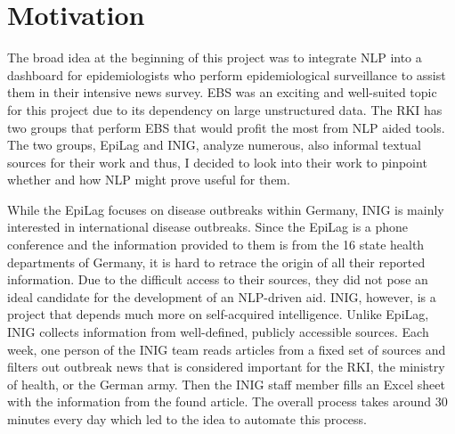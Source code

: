 
\section{Motivation}
  The broad idea at the beginning of this project was to integrate NLP into a dashboard for epidemiologists who perform epidemiological surveillance to assist them in their intensive news survey.
  EBS was an exciting and well-suited topic for this project due to its dependency on large unstructured data.
  The RKI has two groups that perform EBS that would profit the most from NLP aided tools. The two groups, EpiLag and INIG, analyze numerous, also informal textual sources for their work and thus, I decided to look into their work to pinpoint whether and how NLP might prove useful for them.

  While the EpiLag focuses on disease outbreaks within Germany, INIG is mainly interested in international disease outbreaks. Since the EpiLag is a phone conference and the information provided to them is from the 16 state health departments of Germany, it is hard to retrace the origin of all their reported information.
  Due to the difficult access to their sources, they did not pose an ideal candidate for the development of an NLP-driven aid.
  INIG, however, is a project that depends much more on self-acquired intelligence.
  Unlike EpiLag, INIG collects information from well-defined, publicly accessible sources.
  Each week, one person of the INIG team reads articles from a fixed set of sources and filters out outbreak news that is considered important for the RKI, the ministry of health, or the German army.
  Then the INIG staff member fills an Excel sheet with the information from the found article.
  The overall process takes around 30 minutes every day which led to the idea to automate this process.

